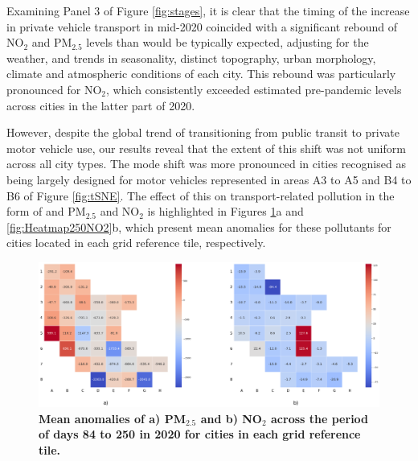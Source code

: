 \documentclass[preprint,12pt]{elsarticle}
\begin{document}
Examining Panel 3 of Figure \ref{fig:stages}, it is clear that the timing of the increase in private vehicle transport in mid-2020 coincided with a significant rebound of NO$_{2}$ and PM$_{2.5}$ levels than would be typically expected, adjusting for the weather, and trends in seasonality, distinct topography, urban morphology, climate and atmospheric conditions of each city\cite{Wijnands2022}. This rebound was particularly pronounced for NO$_{2}$, which consistently exceeded estimated pre-pandemic levels across cities in the latter part of 2020.

However, despite the global trend of transitioning from public transit to private motor vehicle use\cite{fernando2023shaping}, our results reveal that the extent of this shift was not uniform across all city types. The mode shift  was more pronounced in cities recognised as being largely designed for motor vehicles\cite{Thompson2020} represented in areas A3 to A5 and B4 to B6 of Figure \ref{fig:tSNE}. The effect of this on transport-related pollution in the form of and PM$_{2.5}$ and NO$_{2}$ is highlighted in Figures \ref{fig:Heatmap250PM}a and \ref{fig:Heatmap250NO2}b, which present mean anomalies for these pollutants for cities located in each grid reference tile, respectively.


\begin{figure}
\centering

\includegraphics[trim={0 0 0 0},clip,scale=0.25]{Images/pm25Anomaly250_no2Reduction7Ave7Ave250.png}
\caption{\bf Mean anomalies of a) PM$_{2.5}$ and b) NO$_{2}$ across the period of days 84 to 250 in 2020 for cities in each grid reference tile.}  
 \label{fig:Heatmap250NO2}\label{fig:Heatmap250PM}
\end{figure}
\end{document}
